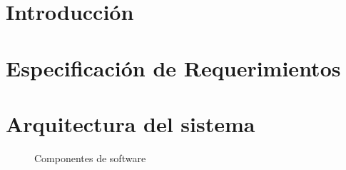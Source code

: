 \documentclass[a4paper]{report}
\begin{document}
\sffamily




\tableofcontents
\listoffigures
\listoftables
\pagebreak

\chapter*{Introducción}

\label{chap:resumen}

\chapter{Especificación de Requerimientos}

\label{chap:espreque}

\chapter{Arquitectura del sistema}
\label{chap:arqsis}


\begin{figure}
   \noindent{}
   \caption{Componentes de software}\label{fig:componentes}
\end{figure}
\end{document}
